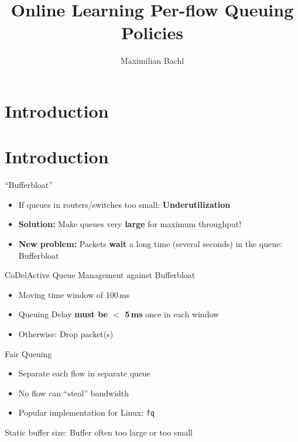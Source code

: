\documentclass[xcolor={dvipsnames}]{beamer}
\title{Online Learning Per-flow Queuing Policies}
\author[M. Bachl]{%
	Maximilian Bachl\email{maximilian.bachl@tuwien.ac.at}
}
\institute{%
	Technische Universität Wien, Vienna, Austria
}
\date[\mydate]{\mydate}
\begin{document}
\maketitle

\section{Introduction}

\section{Introduction}

\begin{frame}{``Bufferbloat''}
  \begin{itemize}
  \item If queues in routers/switches too small: \textbf{Underutilization}
  \item \textbf{Solution:} Make queues very \textbf{large} for maximum throughput!
  \item \textbf{New problem:} Packets \textbf{wait} a long time (several seconds) in the queue: Bufferbloat
  \end{itemize}
\end{frame}

\begin{frame}{CoDel}{Active Queue Management against Bufferbloat}
  \begin{itemize}
  \item Moving time window of 100\,ms
  \item Queuing Delay \textbf{must be $<$ 5\,ms} once in each window
  \item Otherwise: Drop packet(s)
  \end{itemize}
\end{frame}

\begin{frame}{Fair Queuing}
  \begin{itemize}
  \item Separate each flow in separate queue
  \item No flow can ``steal'' bandwidth
  \item Popular implementation for Linux: \texttt{fq}
  \end{itemize}
  \pause
  \begin{alertblock}{Static buffer size:}
	Buffer often too large or too small 
  \end{alertblock}
\end{frame}
\end{document}
